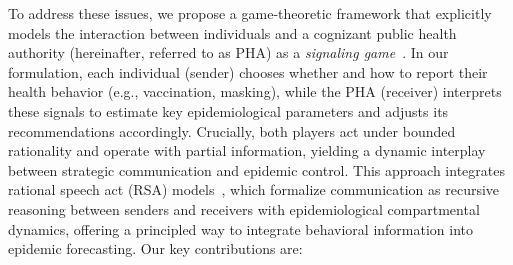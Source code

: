\documentclass[sigconf,review]{acmart}
\begin{document}
To address these issues, we propose a game-theoretic framework that explicitly models the interaction between individuals and a cognizant public health authority (hereinafter, referred to as PHA) as a \emph{signaling game}~\cite{SobelGT2020}. In our formulation, each individual (sender) chooses whether and how to report their health behavior (e.g., vaccination, masking), while the PHA (receiver) interprets these signals to estimate key epidemiological parameters and adjusts its recommendations accordingly. Crucially, both players act under bounded rationality and operate with partial information, yielding a dynamic interplay between strategic communication and epidemic control. This approach integrates rational speech act (RSA) models~\cite{DegenARL2023}, which formalize communication as recursive reasoning between senders and receivers with epidemiological compartmental dynamics, offering a principled way to integrate behavioral information into epidemic forecasting.  Our key contributions are:
    
    

\end{document}

